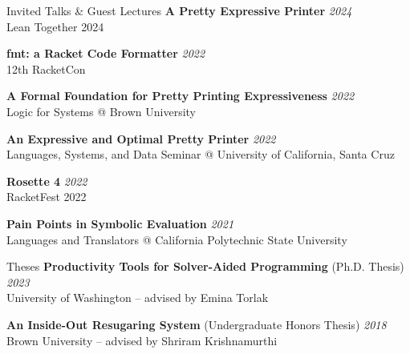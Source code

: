 \documentclass{resume} %
\begin{document}
\begin{rSection}{Invited Talks \& Guest Lectures}
  {\bf A Pretty Expressive Printer} \hfill {\em 2024} \\
  Lean Together 2024
  
  {\bf fmt: a Racket Code Formatter} \hfill {\em 2022} \\
  12th RacketCon

  {\bf A Formal Foundation for Pretty Printing Expressiveness} \hfill {\em 2022} \\
  Logic for Systems @ Brown University

  {\bf An Expressive and Optimal Pretty Printer} \hfill {\em 2022} \\
  Languages, Systems, and Data Seminar @ University of California, Santa Cruz

  {\bf Rosette 4} \hfill {\em 2022} \\
  RacketFest 2022

  {\bf Pain Points in Symbolic Evaluation} \hfill {\em 2021} \\
  Languages and Translators @ California Polytechnic State University
\end{rSection}

\begin{rSection}{Theses}
  {\bf Productivity Tools for Solver-Aided Programming} (Ph.D. Thesis) \hfill {\em 2023} \\
  University of Washington -- advised by Emina Torlak
  
  {\bf An Inside-Out Resugaring System} (Undergraduate Honors Thesis) \hfill {\em 2018} \\
  Brown University -- advised by Shriram Krishnamurthi
\end{rSection}
\end{document}
